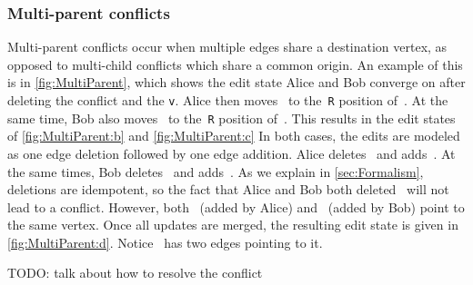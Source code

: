 \subsubsection{Multi-parent conflicts}%
\label{sub:Multi-parent conflicts}

\figureMultiParent{}

Multi-parent conflicts occur when multiple edges share a destination vertex,
as opposed to multi-child conflicts which share a common origin.
An example of this is in \autoref{fig:MultiParent},
which shows the edit state Alice and Bob converge on after deleting the conflict and the \texttt{v}.
Alice then moves~\vNestedPartsAlice{} to the~\texttt{R} position of~\vSimpleTimes{}.
At the same time, Bob also moves~\vNestedPartsAlice{} to the~\texttt{R} position of~\vWrapPlus{}.
This results in the edit states of \autoref{fig:MultiParent:b} and \autoref{fig:MultiParent:c}
In both cases, the edits are modeled as one edge deletion followed by one edge addition.
Alice deletes~\eNestedPartsAlice{} and adds~\eMultiParentAlice{}.
At the same times, Bob deletes~\eNestedPartsAlice{} and adds~\eMultiParentBob{}.
As we explain in \autoref{sec:Formalism}, deletions are idempotent,
so the fact that Alice and Bob both deleted~\eNestedPartsAlice{} will not lead to a conflict.
However, both~\eMultiParentAlice{} (added by Alice) and~\eMultiParentBob{} (added by Bob)
point to the same vertex.
Once all updates are merged, the resulting edit state is given in \autoref{fig:MultiParent:d}.
Notice~\vNestedPartsAlice{} has two edges pointing to it.

TODO: talk about how to resolve the conflict






